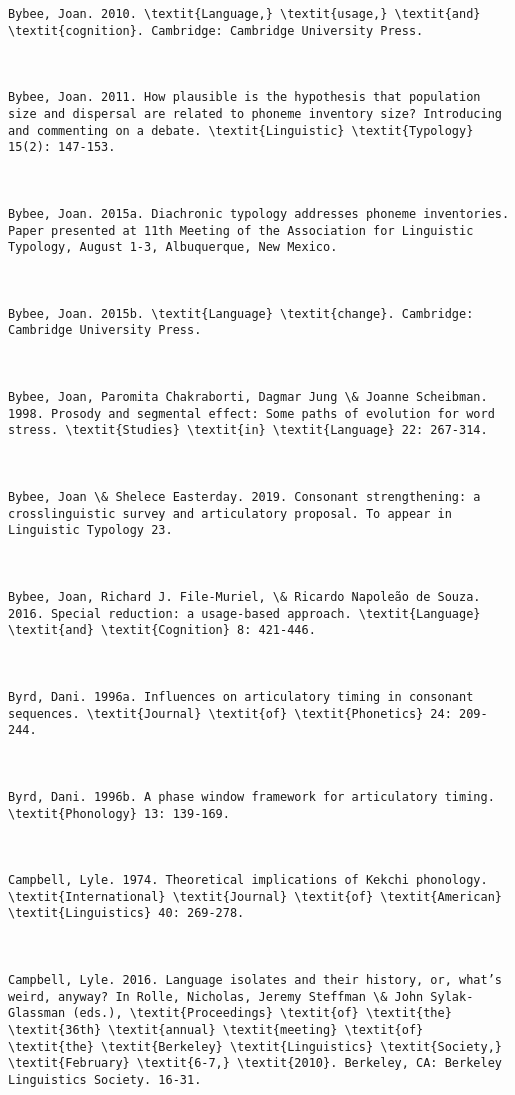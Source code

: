 \begin{verbatim}
Bybee, Joan. 2010. \textit{Language,} \textit{usage,} \textit{and} \textit{cognition}. Cambridge: Cambridge University Press.



Bybee, Joan. 2011. How plausible is the hypothesis that population size and dispersal are related to phoneme inventory size? Introducing and commenting on a debate. \textit{Linguistic} \textit{Typology} 15(2): 147-153.



Bybee, Joan. 2015a. Diachronic typology addresses phoneme inventories. Paper presented at 11th Meeting of the Association for Linguistic Typology, August 1-3, Albuquerque, New Mexico.



Bybee, Joan. 2015b. \textit{Language} \textit{change}. Cambridge: Cambridge University Press.



Bybee, Joan, Paromita Chakraborti, Dagmar Jung \& Joanne Scheibman. 1998. Prosody and segmental effect: Some paths of evolution for word stress. \textit{Studies} \textit{in} \textit{Language} 22: 267-314.



Bybee, Joan \& Shelece Easterday. 2019. Consonant strengthening: a crosslinguistic survey and articulatory proposal. To appear in Linguistic Typology 23.



Bybee, Joan, Richard J. File-Muriel, \& Ricardo Napoleão de Souza. 2016. Special reduction: a usage-based approach. \textit{Language} \textit{and} \textit{Cognition} 8: 421-446.



Byrd, Dani. 1996a. Influences on articulatory timing in consonant sequences. \textit{Journal} \textit{of} \textit{Phonetics} 24: 209-244.



Byrd, Dani. 1996b. A phase window framework for articulatory timing. \textit{Phonology} 13: 139-169.



Campbell, Lyle. 1974. Theoretical implications of Kekchi phonology. \textit{International} \textit{Journal} \textit{of} \textit{American} \textit{Linguistics} 40: 269-278.



Campbell, Lyle. 2016. Language isolates and their history, or, what’s weird, anyway? In Rolle, Nicholas, Jeremy Steffman \& John Sylak-Glassman (eds.), \textit{Proceedings} \textit{of} \textit{the} \textit{36th} \textit{annual} \textit{meeting} \textit{of} \textit{the} \textit{Berkeley} \textit{Linguistics} \textit{Society,} \textit{February} \textit{6-7,} \textit{2010}. Berkeley, CA: Berkeley Linguistics Society. 16-31.




\end{verbatim}
